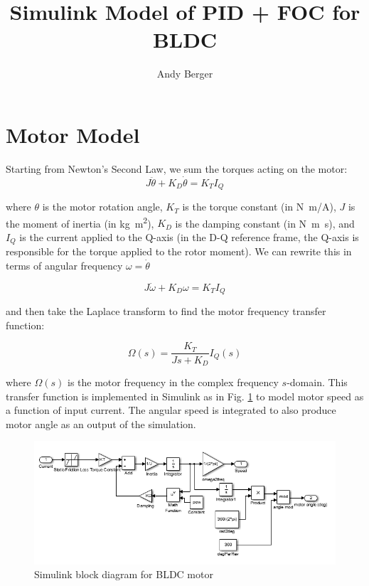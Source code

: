 \documentclass[11pt]{article} %
\title{Simulink Model of PID + FOC for BLDC}
\author{Andy Berger}
\begin{document}
\maketitle

\section{Motor Model}
Starting from Newton's Second Law, we sum the torques acting on the motor:
\begin{equation}
J \ddot{\theta} + K_D \dot{\theta} = K_T I_Q
\end{equation}

\noindent where $\theta$ is the motor rotation angle, $K_T$ is the torque constant (in \si{N.m/A}), $J$ is the moment of inertia (in \si{kg.m^2}), $K_D$ is the damping constant (in \si{N.m.s}), and $I_Q$ is the current applied to the Q-axis (in the D-Q reference frame, the Q-axis is responsible for the torque applied to the rotor moment). We can rewrite this in terms of angular frequency $\omega = \dot{\theta}$

\begin{equation}
J \dot{\omega} + K_D \omega = K_T I_Q
\end{equation}

\noindent and then take the Laplace transform to find the motor frequency transfer function:

\begin{equation}
\Omega(s) = \frac{K_T}{J s + K_D} I_Q(s)
\label{eq:OmegaTransFxn}
\end{equation}
\noindent 

\noindent where $\Omega(s)$ is the motor frequency in the complex frequency $s$-domain. This transfer function is implemented in Simulink as in Fig. \ref{fig:BLDCblockDiagram} to model motor speed as a function of input current. The angular speed is integrated to also produce motor angle as an output of the simulation.

\begin{figure}
\centering
\includegraphics[scale=0.75]{BLDCblockDiagram.png}
\caption{Simulink block diagram for BLDC motor}
\label{fig:BLDCblockDiagram}
\end{figure}
\end{document}
